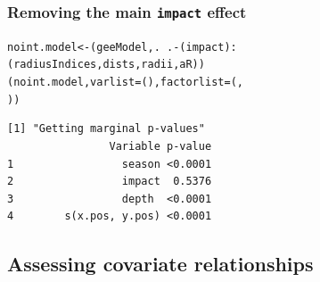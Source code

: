 \begin{frame}[fragile]
\frametitle{Removing the main {\tt impact} effect}
\begin{knitrout}\footnotesize
{}\color{fgcolor}\begin{kframe}
\begin{alltt}
noint.model<-(geeModel, .~. - (impact):
                     (radiusIndices, dists, radii, aR))
(noint.model, varlist = (), factorlist = (, 
    ))
\end{alltt}
\begin{verbatim}
[1] "Getting marginal p-values"
                Variable p-value
1                 season <0.0001
2                 impact  0.5376
3                 depth  <0.0001
4        s(x.pos, y.pos) <0.0001

\end{verbatim}
\end{kframe}
\end{knitrout}

\end{frame}


\subsection{Assessing covariate relationships}

